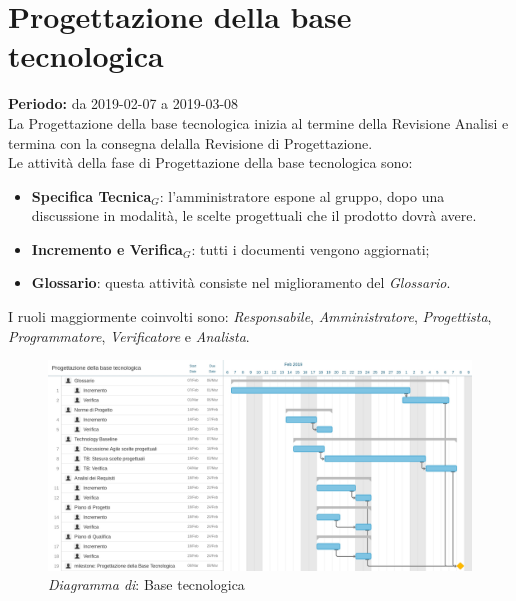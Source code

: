 \section{Progettazione della base tecnologica}
\textbf{Periodo:} da 2019-02-07 a 2019-03-08\\
La Progettazione della base tecnologica inizia al termine della Revisione Analisi e termina con la consegna delalla Revisione di Progettazione.\\
Le attività della fase di Progettazione della base tecnologica sono:
\begin{itemize}
    \item \textbf{Specifica Tecnica$_{G}$}: l'amministratore espone al gruppo, dopo una discussione in modalità, le scelte progettuali che il prodotto dovrà avere.
    \item \textbf{Incremento e Verifica$_{G}$}: tutti i documenti vengono aggiornati;
    \item \textbf{Glossario}: questa attività consiste nel miglioramento del \textit{Glossario}.
\end{itemize}
I ruoli maggiormente coinvolti sono: \textit{Responsabile}, \textit{Amministratore}, \textit{Progettista}, \textit{Programmatore}, \textit{Verificatore} e \textit{Analista}.
\begin{figure} [h]
    \centering
    \includegraphics[scale=0.13]{./images/base_tecnologica.jpg}
    \caption{\textit{Diagramma di}: Base tecnologica }\label{}
\end{figure}
\newpage
